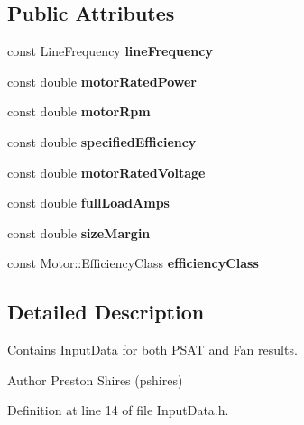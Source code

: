 \subsection*{Public Attributes}
\begin{DoxyCompactItemize}
\item 
\mbox{\label{struct_motor_a51e3b0191b70b167348f6d1fcf33dffa}} 
const Line\+Frequency {\bfseries line\+Frequency}
\item 
\mbox{\label{struct_motor_ac488edfbd918e91b2cf5581bae6a3d42}} 
const double {\bfseries motor\+Rated\+Power}
\item 
\mbox{\label{struct_motor_aa437c0e2db53bbc948794afb1081b059}} 
const double {\bfseries motor\+Rpm}
\item 
\mbox{\label{struct_motor_a1b202cba6ed0b1f13c5fe1b768148d5d}} 
const double {\bfseries specified\+Efficiency}
\item 
\mbox{\label{struct_motor_a7b7e315f3de114d48fce9d87606540f1}} 
const double {\bfseries motor\+Rated\+Voltage}
\item 
\mbox{\label{struct_motor_a7e11d5569d1ec3b3ecb2dfa6d5f19727}} 
const double {\bfseries full\+Load\+Amps}
\item 
\mbox{\label{struct_motor_a5d05eed62ab3c38056d72a706836d214}} 
const double {\bfseries size\+Margin}
\item 
\mbox{\label{struct_motor_a69eb3624f866ac1b27865ca494414c1c}} 
const Motor\+::\+Efficiency\+Class {\bfseries efficiency\+Class}
\end{DoxyCompactItemize}


\subsection{Detailed Description}
Contains Input\+Data for both P\+S\+AT and Fan results. 

\begin{DoxyAuthor}{Author}
Preston Shires (pshires) 
\end{DoxyAuthor}


Definition at line 14 of file Input\+Data.\+h.



